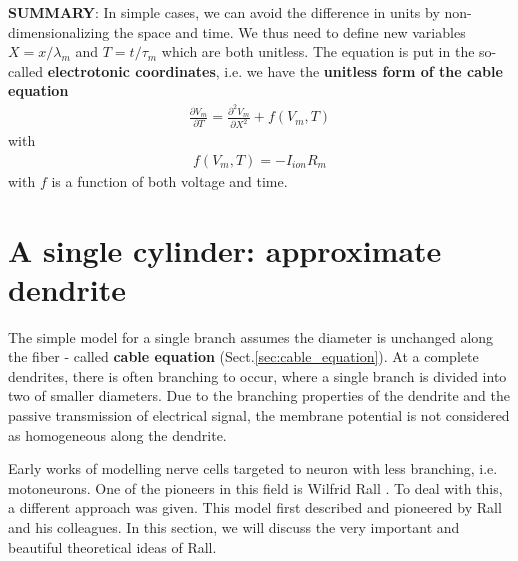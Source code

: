 {\bf SUMMARY}: In simple cases, we can avoid the difference in units
by non-dimensionalizing the space and time. We thus need to define new
variables $X=x/\lambda_m$ and $T=t/\tau_m$ which are both
unitless. The equation is put in the so-called
{\bf electrotonic coordinates}, i.e. we have the
{\bf unitless form of the cable equation}
\begin{eqnarray}
  \label{eq:436}
  \frac{\partial V_m}{\partial T}  =
  \frac{\partial^2V_m}{\partial X^2} + f(V_m,T)
\end{eqnarray}
with 
\begin{eqnarray}
  \label{eq:437}
  f(V_m,T) = -I_{ion}R_m
\end{eqnarray}
with $f$ is a function of both voltage and time. 



\section{A single cylinder: approximate dendrite}
\label{sec:non-isop-cell}
\label{sec:model-dendrite_cable-approximation -of-branching}
\label{sec:theor-prop}

The simple model for a single branch assumes the diameter is unchanged
along the fiber - called {\bf cable equation} (Sect.\ref{sec:cable_equation}).
At a complete dendrites, there is often branching to occur, where a single
branch is divided into two of smaller diameters. 
Due to the branching properties of the dendrite and the passive transmission of
electrical signal, the membrane potential is not considered as homogeneous along
the dendrite.

Early works of modelling nerve cells targeted to neuron with less branching,
i.e. motoneurons. One of the pioneers in this field is Wilfrid Rall
\citep{rall1962tpp, rall1969tce, rall1989ctdn, rall2006bio}.  
To deal with this, a different approach was given. This model first described
and pioneered by Rall and his colleagues. 
In this section, we will discuss the very important and beautiful
theoretical ideas of Rall.


